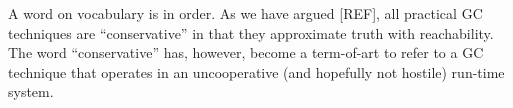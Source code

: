 A word on vocabulary is in order. As we have argued [REF], all practical GC
techniques are “conservative” in that they approximate truth with reachability.
The word “conservative” has, however, become a term-of-art to refer to a GC
technique that operates in an uncooperative (and hopefully not hostile) run-time
system.
